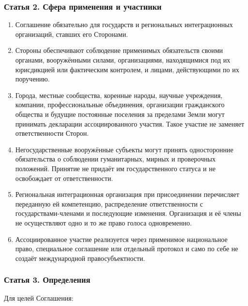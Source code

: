 \documentclass[
  russian,
  11pt,
  a4paper,
]{article}
\providecommand{\tightlist}{%
  \setlength{\itemsep}{0pt}\setlength{\parskip}{0pt}}
\begin{document}
\subsubsection{Статья 2. Сфера применения и
участники}\label{ux441ux442ux430ux442ux44cux44f-2-ux441ux444ux435ux440ux430-ux43fux440ux438ux43cux435ux43dux435ux43dux438ux44f-ux438-ux443ux447ux430ux441ux442ux43dux438ux43aux438}

\begin{enumerate}
\def\labelenumi{\arabic{enumi}.}
\tightlist
\item
  Соглашение обязательно для государств и региональных интеграционных
  организаций, ставших его Сторонами.
\item
  Стороны обеспечивают соблюдение применимых обязательств своими
  органами, вооружёнными силами, организациями, находящимися под их
  юрисдикцией или фактическим контролем, и лицами, действующими по их
  поручению.
\item
  Города, местные сообщества, коренные народы, научные учреждения,
  компании, профессиональные объединения, организации гражданского
  общества и будущие постоянные поселения за пределами Земли могут
  принимать декларации ассоциированного участия. Такое участие не
  заменяет ответственности Сторон.
\item
  Негосударственные вооружённые субъекты могут принять односторонние
  обязательства о соблюдении гуманитарных, мирных и проверочных
  положений. Принятие не придаёт им государственного статуса и не
  освобождает от ответственности.
\item
  Региональная интеграционная организация при присоединении перечисляет
  переданную ей компетенцию, распределение ответственности с
  государствами-членами и последующие изменения. Организация и её члены
  не осуществляют одно и то же право голоса одновременно.
\item
  Ассоциированное участие реализуется через применимое национальное
  право, специальное соглашение или отдельный протокол и само по себе не
  создаёт международной правосубъектности.
\end{enumerate}

\subsubsection{Статья 3.
Определения}\label{ux441ux442ux430ux442ux44cux44f-3-ux43eux43fux440ux435ux434ux435ux43bux435ux43dux438ux44f}

Для целей Соглашения:
\end{document}
